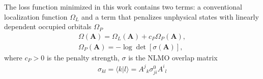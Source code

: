 \documentclass[aps,prl,reprint,amsmath,amssymb]{revtex4-1}
\newcommand{\braket}[2]{\ensuremath{\langle #1 \vert #2 \rangle}} %
\begin{document}
The loss function minimized in this work contains two terms: a conventional localization function $\Omega_L$ and a term that penalizes unphysical states with linearly dependent occupied orbitals $\Omega_P$
%
\begin{equation} \label{eq:fun-pen}
\begin{split}
\Omega(\mathbf{A}) = \Omega_L(\mathbf{A}) + c_P \Omega_P(\mathbf{A}), \\
\Omega_P(\mathbf{A}) = - \log \det \left[ \sigma (\mathbf{A}) \right],
\end{split}
\end{equation}
%
where $c_P > 0$ is the penalty strength, $\sigma$ is the NLMO overlap matrix 
%
\begin{equation}
\begin{split}
\sigma_{kl} = \braket{k}{l} = {A^j}_k \sigma_{ji}^0{A^i}_l
\end{split}
\end{equation}
%
\end{document}
